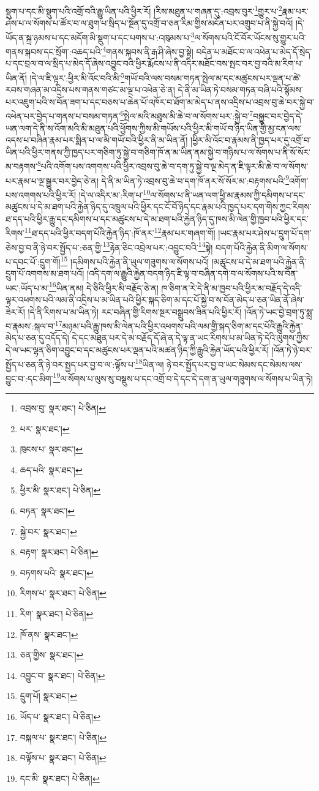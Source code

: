 སྡུག་པ་དང་མི་སྡུག་པའི་འགྲོ་བའི་རྒྱུ་ཡིན་པའི་ཕྱིར་རོ། །རིས་མཐུན་པ་གཞན་དུ་:འབྲས་བུར་\footnote{འབྲས་བུ་  སྣར་ཐང་།  པེ་ཅིན། }གྱུར་པ་\footnote{པར་  སྣར་ཐང་། }རྣམ་པར་ཤེས་པ་ལ་སོགས་པ་ཚོར་བ་ལ་ཐུག་པ་སྲིད་པ་སྔོན་དུ་འགྲོ་བ་ཅན་རིམ་གྱིས་མངོན་པར་འགྲུབ་པ་ནི་སྐྱེ་བའོ། །དེ་ཡོད་ན་སྐྲ་ཉམས་པ་དང་མདོག་མི་སྡུག་པ་དང་པགས་པ་:འཁུམས་པ་\footnote{ཁུངས་པ་  སྣར་ཐང་། }ལ་སོགས་པའི་ངོ་བོར་ཡོངས་སུ་གྱུར་པའི་གནས་སྐབས་དང་སྲོག་:འཆད་པའི་\footnote{ཆད་པའི་  སྣར་ཐང་། }གནས་སྐབས་ནི་རྒ་ཤི་ཞེས་བྱ་སྟེ། བདེན་པ་མཐོང་བ་ལ་འཕེན་པ་མེད་དོ་སྲེད་པ་དང་བྲལ་བ་ལ་སྲིད་པ་མེད་དོ་ཞེས་འབྱུང་བའི་ཕྱིར་རྨོངས་པ་ནི་འདིར་མཐོང་བས་སྤང་བར་བྱ་བའི་མ་རིག་པ་ཡིན་ནོ། །དེ་ལ་ཇི་ལྟར་:ཕྱིར་མི་འོང་བའི་མི་\footnote{ཕྱིར་མི་  སྣར་ཐང་།  པེ་ཅིན། }གཡོ་བའི་ལས་བསམ་གཏན་སྤེལ་མ་དང་མཚུངས་པར་ལྡན་པ་ཚེ་རབས་གཞན་མ་འདྲིས་པས་གནས་གཙང་མ་ལྔ་པ་འཕེན་ཅེ་ན། དེ་ནི་མ་ཡིན་ཏེ་བསམ་གཏན་བཞི་པའི་སྙོམས་པར་འཇུག་པའི་ས་བོན་ཟག་པ་དང་བཅས་པ་ཆེན་པོ་འཁོར་བ་ཐོག་མ་མེད་པ་ནས་འདྲིས་པ་འབྲས་བུ་ཆེ་བར་སྐྱེ་བ་འཕེན་པར་བྱེད་པ་གནས་པ་བསམ་གཏན་\footnote{བཏན་  སྣར་ཐང་། }སྤེལ་མའི་མཐུས་མི་ཆེ་བ་ལ་སོགས་པར་:སྐྱེ་བ་\footnote{སྐྱེ་བར་  སྣར་ཐང་། }བསྐྱུང་བར་བྱེད་དེ་ཡན་ལག་དེ་ནི་ས་འོག་མའི་མི་མཐུན་པའི་ཕྱོགས་ཀྱིས་མི་གཡོས་པའི་ཕྱིར་མི་གཡོ་བ་ཉིད་ཡིན་གྱི་མྱ་ངན་ལས་འདས་པ་བཞིན་རྣམ་པར་སྨིན་པ་ལ་མི་གཡོ་བའི་ཕྱིར་ནི་མ་ཡིན་ནོ། །ཕྱིར་མི་འོང་བ་རྣམས་ནི་ཁྱད་པར་དུ་འགྲོ་བ་ཡིན་པའི་ཕྱིར་གནས་ཀྱི་ཁྱད་པར་གཅིག་ཏུ་སྐྱེ་བ་གཅིག་ཁོ་ན་མ་ཡིན་ནམ་སྐྱེ་བ་གཉིས་པ་ལ་སོགས་པ་ནི་སོ་སོར་མ་བརྟགས་\footnote{བརྟག་  སྣར་ཐང་།  པེ་ཅིན། }པའི་འགོག་པས་འགགས་པའི་ཕྱིར་འབྲས་བུ་ཆེ་བ་དག་ཏུ་སྐྱེ་བ་ལྔ་མེད་ན་ཇི་ལྟར་མི་ཆེ་བ་ལ་སོགས་པར་རྣམ་པ་ལྔ་སྒྱུར་བར་བྱེད་ཅེ་ན། དེ་ནི་མ་ཡིན་ཏེ་འབྲས་བུ་ཆེ་བ་དག་ཁོ་ནར་སོ་སོར་མ་:བརྟགས་པའི་\footnote{བཏགས་པའི་  སྣར་ཐང་། }འགོག་པས་འགགས་པའི་ཕྱིར་རོ། །དེ་ལ་འདིར་མ་:རིག་པ་\footnote{རིགས་པ་  སྣར་ཐང་།  པེ་ཅིན། }ལ་སོགས་པ་ནི་ཡན་ལག་ཕྱི་མ་རྣམས་ཀྱི་དམིགས་པ་དང་མཚུངས་པ་དེ་མ་ཐག་པའི་རྐྱེན་ཉིད་དུ་འཁྲུལ་པའི་ཕྱིར་དང་ངོ་བོ་ཉིད་དང་རྣམ་པའི་ཁྱད་པར་དག་གིས་ཀྱང་རིགས་ཐ་དད་པའི་ཕྱིར་རྒྱུ་དང་དམིགས་པ་དང་མཚུངས་པ་དེ་མ་ཐག་པའི་རྐྱེན་ཉིད་དུ་ཁས་མི་ལེན་གྱི་ཁྱབ་པའི་ཕྱིར་དང་རིགས་\footnote{རིག་  སྣར་ཐང་།  པེ་ཅིན། }ཐ་དད་པའི་ཕྱིར་བདག་པོའི་རྐྱེན་ཉིད་:ཁོ་ནར་\footnote{ཁོ་ནས་  སྣར་ཐང་། }རྣམ་པར་གཞག་གོ། །ཡང་རྣམ་པར་ཤེས་པ་དྲུག་པོ་དག་ཅེས་བྱ་བ་ནི་ཉེ་བར་སྤྱོད་པ་:ཅན་གྱི་\footnote{ཅན་གྱིས་  སྣར་ཐང་། }རྟེན་ཅིང་འབྲེལ་པར་:འབྱུང་བའི་\footnote{འབྱུང་བ་  སྣར་ཐང་།  པེ་ཅིན། }སྟེ། བདག་པོའི་རྐྱེན་ནི་མིག་ལ་སོགས་པ་དབང་པོ་:དྲུག་གོ།\footnote{དྲུག་པོ།  སྣར་ཐང་། } །དམིགས་པའི་རྐྱེན་ནི་ཡུལ་གཟུགས་ལ་སོགས་པའོ། །མཚུངས་པ་དེ་མ་ཐག་པའི་རྐྱེན་ནི་དྲུག་པོ་འགགས་མ་ཐག་པའོ། །འདི་དག་ལ་རྒྱུའི་རྐྱེན་བདག་ཉིད་ཇི་ལྟ་བ་བཞིན་དགེ་བ་ལ་སོགས་པའི་ས་བོན་ཡང་:ཡོད་པ་མ་\footnote{ཡོད་པ་  སྣར་ཐང་།  པེ་ཅིན། }ཡིན་ནམ། དེ་ཅིའི་ཕྱིར་མི་བརྗོད་ཅེ་ན། ཁ་ཅིག་ན་རེ་དེ་ནི་མ་ཁྱབ་པའི་ཕྱིར་མ་བརྗོད་དེ་འདི་ལྟར་འཕགས་པའི་ལམ་ནི་འདྲིས་པ་མ་ཡིན་པའི་ཕྱིར་སྐད་ཅིག་མ་དང་པོ་སྐྱེ་བ་ས་བོན་མེད་པ་ཅན་ཡིན་ནོ་ཞེས་ཟེར་རོ། །དེ་ནི་རིགས་པ་མ་ཡིན་ཏེ། རང་བཞིན་གྱི་རིགས་སྔར་བསྒྲུབས་ཟིན་པའི་ཕྱིར་རོ། །འོན་ཏེ་ཡང་བྱེ་བྲག་ཏུ་སྨྲ་བ་རྣམས་:སྐལ་བ་\footnote{བསྐལ་པ་  སྣར་ཐང་།  པེ་ཅིན། }མཉམ་པའི་རྒྱུ་ཁས་མི་ལེན་པའི་ཕྱིར་འཕགས་པའི་ལམ་གྱི་སྐད་ཅིག་མ་དང་པོའི་རྒྱུའི་རྐྱེན་མེད་པ་ཅན་དུ་འདོད་དེ། དེ་དང་མཐུན་པར་དེ་མ་བརྗོད་དོ་ཞེ་ན་དེ་ལྟ་ན་ཡང་རིགས་པ་མ་ཡིན་ཏེ་དེའི་ལུགས་ཀྱིས་དེ་ལ་ཡང་ལྷན་ཅིག་འབྱུང་བ་དང་མཚུངས་པར་ལྡན་པའི་མཚན་ཉིད་ཀྱི་རྒྱུའི་རྐྱེན་ཡོད་པའི་ཕྱིར་རོ། །འོན་ཏེ་ཉེ་བར་སྤྱོད་པ་ཅན་ནི་ཉེ་བར་སྤྱད་པར་བྱ་བ་ལ་:ལྟོས་པ་\footnote{བལྟོས་པ་  སྣར་ཐང་།  པེ་ཅིན། }ཡིན་ལ། ཉེ་བར་སྤྱོད་པར་བྱ་བ་ཡང་སེམས་དང་སེམས་ལས་བྱུང་བ་:དང་མིག་\footnote{དང་མི་  སྣར་ཐང་།  པེ་ཅིན། }ལ་སོགས་པ་ལུས་སུ་བསྡུས་པ་དང་འགྲོ་བ་དེ་དང་དེ་དག་ན་ཡུལ་གཟུགས་ལ་སོགས་པ་ཡིན་ཏེ། 